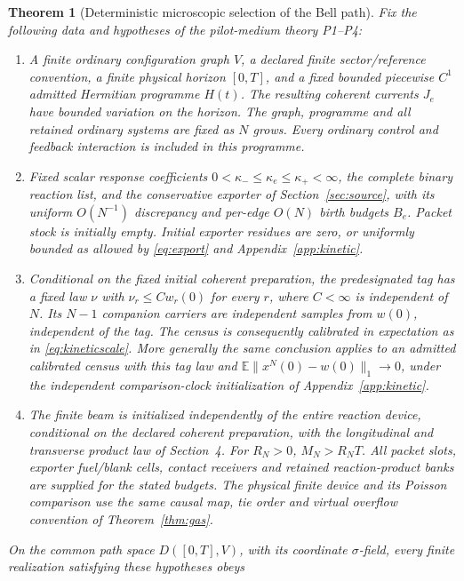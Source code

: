 \documentclass[11pt]{article}
\newtheorem{theorem}{Theorem}[section]
\theoremstyle{definition}\newtheorem{definition}[theorem]{Definition}
\theoremstyle{remark}\newtheorem{remark}[theorem]{Remark}
\newcommand{\E}{\mathbb E}\newcommand{\Prb}{\mathbb P}
\begin{document}
\begin{theorem}[Deterministic microscopic selection of the Bell path]\label{thm:main}
Fix the following data and hypotheses of the pilot-medium theory P1--P4:
\begin{enumerate}[label=(\roman*)]
\item A finite ordinary configuration graph $V$, a declared finite
sector/reference convention, a finite physical horizon $[0,T]$, and a
fixed bounded piecewise $C^1$ admitted Hermitian programme $H(t)$.
The resulting coherent currents $J_e$ have bounded variation on the
horizon. The graph, programme and all retained ordinary systems are
fixed as $N$ grows. Every ordinary control and feedback interaction is
included in this programme.
\item Fixed scalar response coefficients
$0<\kappa_-\le\kappa_e\le\kappa_+<\infty$, the complete binary
reaction list, and the conservative exporter of
Section~\ref{sec:source}, with its uniform $O(N^{-1})$ discrepancy
and per-edge $O(N)$ birth budgets $B_e$. Packet stock is initially
empty. Initial exporter residues are zero, or uniformly bounded as
allowed by \eqref{eq:export} and Appendix~\ref{app:kinetic}.
\item Conditional on the fixed initial coherent preparation, the
predesignated tag has a fixed law $\nu$ with
$\nu_r\le Cw_r(0)$ for every $r$, where $C<\infty$ is independent
of $N$. Its $N-1$ companion carriers are independent samples from
$w(0)$, independent of the tag. The census is consequently calibrated
in expectation as in \eqref{eq:kineticscale}. More generally the
same conclusion applies to an admitted calibrated census with this
tag law and $\E\|x^N(0)-w(0)\|_1\to0$, under the independent
comparison-clock initialization of Appendix~\ref{app:kinetic}.
\item The finite beam is initialized independently of the entire
reaction device, conditional on the declared coherent preparation,
with the longitudinal and transverse product law of Section~4.
For $R_N>0$, $M_N>R_NT$. All packet slots, exporter fuel/blank
cells, contact receivers and retained reaction-product banks are
supplied for the stated budgets. The physical finite device and its
Poisson comparison use the same causal map, tie order and virtual
overflow convention of Theorem~\ref{thm:gas}.
\end{enumerate}
On the common path space $D([0,T],V)$, with its coordinate
$\sigma$-field, every finite realization satisfying these hypotheses obeys
\begin{equation}

\end{equation}
\end{theorem}
\end{document}
